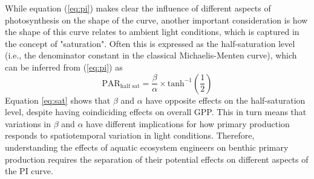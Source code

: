 While equation (\ref{eq:pi}) makes clear the influence of different aspects of photosynthesis
on the shape of the curve, 
another important consideration is how the shape of this curve relates to ambient light
conditions, which is captured in the concept of "saturation". 
Often this is expressed as the half-saturation level 
(i.e., the denominator constant in the classical Michaelis-Menten curve), 
which can be inferred from (\ref{eq:pi}) as
%
\begin{equation} \label{eq:sat}
  \text{PAR}_{\text{half~sat}} = 
    \frac{\beta} {\alpha} \times \text{tanh}^{-1} \left(\frac{1}{2}\right)
\end{equation}
%
Equation \ref{eq:sat} shows that $\beta$ and $\alpha$ have opposite effects on the 
half-saturation level, 
despite having coindiciding effects on overall GPP.
This in turn means that variations in $\beta$ and $\alpha$ have 
different implications for how primary production responds to spatiotemporal variation 
in light conditions.
Therefore,
understanding the effects of aquatic ecosystem engineers on benthic primary production
requires the separation of their potential effects on different aspects of the PI curve.

